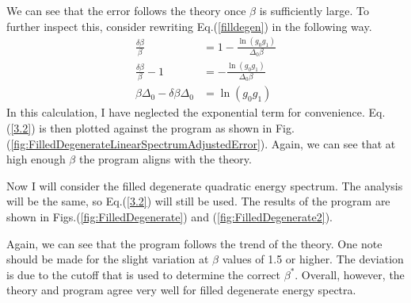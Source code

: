 We can see that the error follows the theory once $\beta$ is sufficiently large. To further inspect this, consider rewriting Eq.\@ (\ref{filldegen}) in the following way. 
\begin{align}
    \frac{\delta\beta}{\beta}&=1-\frac{\ln(g_0g_1)}{\Delta_0\beta}\nonumber\\
    \frac{\delta\beta}{\beta}-1&=-\frac{\ln(g_0g_1)}{\Delta_0\beta}\nonumber\\
    \beta\Delta_0-\delta\beta\Delta_0&=\ln(g_0g_1) \label{3.2}
\end{align}
In this calculation, I have neglected the exponential term for convenience. Eq.\@ (\ref{3.2}) is then plotted against the program as shown in Fig. (\ref{fig:FilledDegenerateLinearSpectrumAdjustedError}). 
Again, we can see that at high enough $\beta$ the program aligns with the theory. 

Now I will consider the filled degenerate quadratic energy spectrum. The analysis will be the same, so Eq.\@ (\ref{3.2}) will still be used. The results of the program are shown in Figs.\@ (\ref{fig:FilledDegenerate}) and (\ref{fig:FilledDegenerate2}). 


Again, we can see that the program follows the trend of the theory. One note should be made for the slight variation at $\beta$ values of 1.5 or higher. The deviation is due to the cutoff that is used to determine the correct $\beta^*$. Overall, however, the theory and program agree very well for filled degenerate energy spectra.

